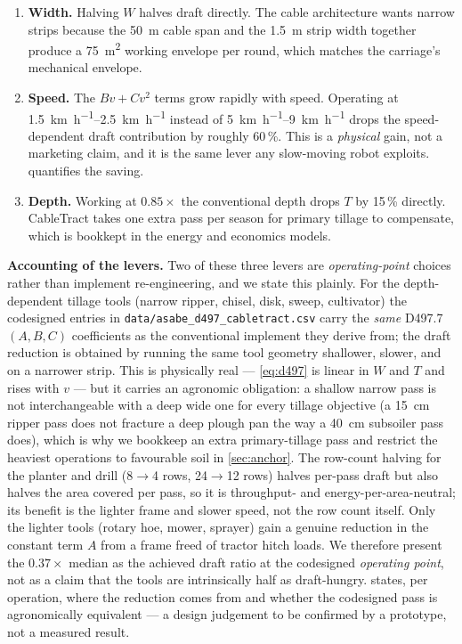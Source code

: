 \documentclass[11pt,a4paper]{article}
\begin{document}
\begin{enumerate}[leftmargin=1.6em,itemsep=0.15em]
    \item \textbf{Width.} Halving $W$ halves draft directly. The cable architecture wants narrow strips because the \SI{50}{\meter} cable span and the \SI{1.5}{\meter} strip width together produce a \SI{75}{\meter\squared} working envelope per round, which matches the carriage's mechanical envelope.
    \item \textbf{Speed.} The $B v + C v^{2}$ terms grow rapidly with speed. Operating at \SIrange{1.5}{2.5}{\kilo\meter\per\hour} instead of \SIrange{5}{9}{\kilo\meter\per\hour} drops the speed-dependent draft contribution by roughly 60\,\%. This is a \emph{physical} gain, not a marketing claim, and it is the same lever any slow-moving robot exploits.  quantifies the saving.
    \item \textbf{Depth.} Working at $0.85\times$ the conventional depth drops $T$ by 15\,\% directly. CableTract takes one extra pass per season for primary tillage to compensate, which is bookkept in the energy and economics models.
\end{enumerate}

\textbf{Accounting of the levers.} Two of these three levers are \emph{operating-point} choices rather than implement re-engineering, and we state this plainly. For the depth-dependent tillage tools (narrow ripper, chisel, disk, sweep, cultivator) the codesigned entries in \texttt{data/asabe\_d497\_cabletract.csv} carry the \emph{same} D497.7 $(A,B,C)$ coefficients as the conventional implement they derive from; the draft reduction is obtained by running the same tool geometry shallower, slower, and on a narrower strip. This is physically real --- \cref{eq:d497} is linear in $W$ and $T$ and rises with $v$ --- but it carries an agronomic obligation: a shallow narrow pass is not interchangeable with a deep wide one for every tillage objective (a \SI{15}{\centi\meter} ripper pass does not fracture a deep plough pan the way a \SI{40}{\centi\meter} subsoiler pass does), which is why we bookkeep an extra primary-tillage pass and restrict the heaviest operations to favourable soil in \cref{sec:anchor}. The row-count halving for the planter and drill (8$\to$4 rows, 24$\to$12 rows) halves per-pass draft but also halves the area covered per pass, so it is throughput- and energy-per-area-neutral; its benefit is the lighter frame and slower speed, not the row count itself. Only the lighter tools (rotary hoe, mower, sprayer) gain a genuine reduction in the constant term $A$ from a frame freed of tractor hitch loads. We therefore present the $0.37\times$ median as the achieved draft ratio at the codesigned \emph{operating point}, not as a claim that the tools are intrinsically half as draft-hungry.  states, per operation, where the reduction comes from and whether the codesigned pass is agronomically equivalent --- a design judgement to be confirmed by a prototype, not a measured result.
\end{document}
